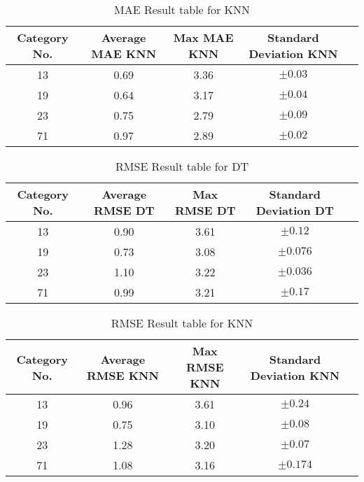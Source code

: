 \documentclass[document.tex]{subfiles}
\begin{document}
\begin{table}[H]
	\begin{center}
		\begin{tabular}{ |c|c|c|c|c| } 
			\hline 
			Category No. & Average MAE KNN & Max MAE KNN & Standard Deviation KNN \\
			\hline
			13	& 0.69	& 3.36	& $\pm0.03$\\
			19	& 0.64	& 3.17	& $\pm0.04$\\
			23	& 0.75	& 2.79	& $\pm0.09$\\
			71	& 0.97	& 2.89	& $\pm0.02$\\
			
			\hline
		\end{tabular}
		\caption{MAE Result table for KNN}
		\label{MaetableReskn}
	\end{center}
	
\end{table}

\begin{table}[H]
	\begin{center}
		\begin{tabular}{ |c|c|c|c|c| } 
			\hline 
			Category No. & Average RMSE DT & Max RMSE DT & Standard Deviation DT \\
			\hline
			13  & 0.90	& 3.61	& $\pm0.12$\\
			19	& 0.73	& 3.08	& $\pm0.076$\\
			23	& 1.10	& 3.22	& $\pm0.036$\\
			71	& 0.99	& 3.21	& $\pm0.17$\\
			
			\hline
		\end{tabular}
		\caption{RMSE Result table for DT}
		\label{tableResdt}
	\end{center}
	
\end{table}

\begin{table}[H]
	\begin{center}
		\begin{tabular}{ |c|c|c|c|c| } 
			\hline 
			Category No. & Average RMSE KNN & Max RMSE KNN & Standard Deviation KNN \\
			\hline
			13	& 0.96	& 3.61	& $\pm0.24$\\
			19	& 0.75	& 3.10	& $\pm0.08$\\
			23	& 1.28	& 3.20	& $\pm0.07$\\
			71	& 1.08	& 3.16	& $\pm0.174$\\
			
			\hline
		\end{tabular}
		\caption{RMSE Result table for KNN}
		\label{tableReskn}
	\end{center}
	
\end{table}
\end{document}
